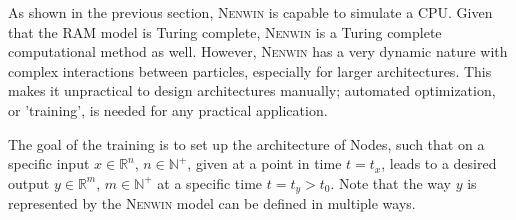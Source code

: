 As shown in the previous section, \textsc{Nenwin} is capable to simulate a CPU. Given that the RAM model is Turing complete, \textsc{Nenwin} is a Turing complete computational method as well. However, \textsc{Nenwin} has a very dynamic nature with complex interactions between particles, especially for larger architectures. This makes it unpractical to design architectures manually; automated optimization, or 'training', is needed for any practical application. 

The goal of the training is to set up the architecture of Nodes, such that on a specific input $x \in \mathbb{R}^n$, $n \in \mathbb{N^+}$, given at a point in time $t = t_x$, leads to a desired output $y \in \mathbb{R}^m$, $m \in \mathbb{N^+}$ at a specific time $t = t_y > t_0$. Note that the way $y$ is represented by the \textsc{Nenwin} model can be defined in multiple ways.